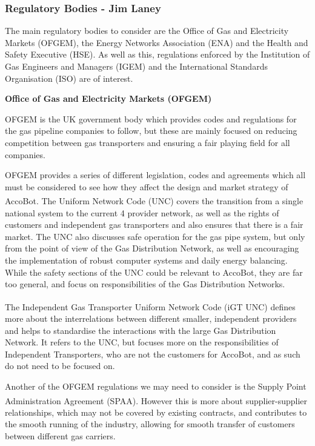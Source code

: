\documentclass[11pt]{article}		%
\newcommand{\supercite}[1]{\textsuperscript{\cite{#1}}}		%
\begin{document}
		\subsubsection[Regulatory Bodies]{Regulatory Bodies - Jim Laney}
			
			The main regulatory bodies to consider are the Office of Gas and Electricity Markets (OFGEM), the Energy Networks Association (ENA) and the Health and Safety Executive (HSE).
			As well as this, regulations enforced by the Institution of Gas Engineers and Managers (IGEM) and the International Standards Organisation (ISO) are of interest.
 			
 			\textbf{Office of Gas and Electricity Markets (OFGEM)}
 			
			OFGEM is the UK government body which provides codes and regulations for the gas pipeline companies to follow, but these are mainly focused on reducing competition between gas transporters and ensuring a fair playing field for all companies.
			
			OFGEM provides a series of different legislation, codes and agreements which all must be considered to see how they affect the design and market strategy of AccoBot.
			The Uniform Network Code (UNC)\supercite{joint2005uniform} covers the transition from a single national system to the current 4 provider network, as well as the rights of customers and independent gas transporters and also ensures that there is a fair market.
			The UNC also discusses safe operation for the gas pipe system, but only from the point of view of the Gas Distribution Network, as well as encouraging the implementation of robust computer systems and daily energy balancing.
			While the safety sections of the UNC could be relevant to AccoBot, they are far too general, and focus on responsibilities of the Gas Distribution Networks.
			
			The Independent Gas Transporter Uniform Network Code (iGT UNC)\supercite{igt2021independent} defines more about the interrelations between different smaller, independent providers and helps to standardise the interactions with the large Gas Distribution Network.
			It refers to the UNC, but focuses more on the responsibilities of Independent Transporters, who are not the customers for AccoBot, and as such do not need to be focused on.
			
			Another of the OFGEM regulations we may need to consider is the Supply Point Administration Agreement (SPAA)\supercite{spaa2021supply}. 
			However this is more about supplier-supplier relationships, which may not be covered by existing contracts, and contributes to the smooth running of the industry, allowing for smooth transfer of customers between different gas carriers.
			
\end{document}
